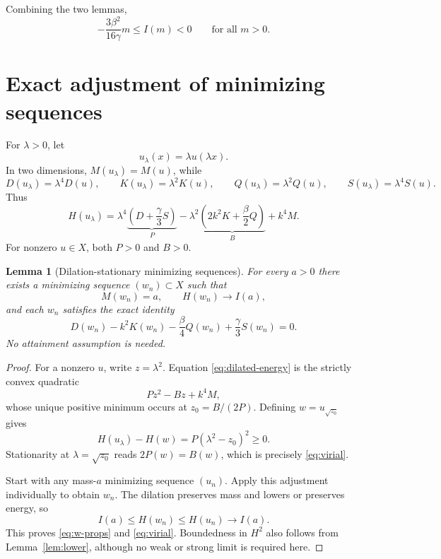 \documentclass[11pt,letterpaper]{article}
\numberwithin{equation}{section}
\newtheorem{lemma}[theorem]{Lemma}
\begin{document}
Combining the two lemmas,
\begin{equation}\label{eq:finite-negative}
 -\frac{3\beta^2}{16\gamma}m\le I(m)<0
 \qquad\text{for all }m>0.
\end{equation}

\section{Exact adjustment of minimizing sequences}

For $\lambda>0$, let
\begin{equation}\label{eq:dilation}
 u_\lambda(x)=\lambda u(\lambda x).
\end{equation}
In two dimensions, $M(u_\lambda)=M(u)$, while
\[
 D(u_\lambda)=\lambda^4 D(u),\qquad
 K(u_\lambda)=\lambda^2 K(u),\qquad
 Q(u_\lambda)=\lambda^2 Q(u),\qquad
 S(u_\lambda)=\lambda^4 S(u).
\]
Thus
\begin{equation}\label{eq:dilated-energy}
 H(u_\lambda)=\lambda^4\underbrace{\left(D+\frac\gamma3 S\right)}_{P}
 -\lambda^2\underbrace{\left(2k^2K+\frac\beta2 Q\right)}_{B}
 +k^4M.
\end{equation}
For nonzero $u\in X$, both $P>0$ and $B>0$.

\begin{lemma}[Dilation-stationary minimizing sequences]\label{lem:adjust}
For every $a>0$ there exists a minimizing sequence $(w_n)\subset X$ such that
\begin{equation}\label{eq:w-props}
 M(w_n)=a,\qquad H(w_n)\longrightarrow I(a),
\end{equation}
and each $w_n$ satisfies the exact identity
\begin{equation}\label{eq:virial}
 \boxed{\ D(w_n)-k^2K(w_n)-\frac\beta4 Q(w_n)
                   +\frac\gamma3 S(w_n)=0.\ }
\end{equation}
No attainment assumption is needed.
\end{lemma}
\begin{proof}
For a nonzero $u$, write $z=\lambda^2$. Equation \eqref{eq:dilated-energy} is the strictly convex quadratic
\[
 Pz^2-Bz+k^4M,
\]
whose unique positive minimum occurs at $z_0=B/(2P)$. Defining $w=u_{\sqrt{z_0}}$ gives
\begin{equation}\label{eq:exact-square}
 H(u_\lambda)-H(w)=P(\lambda^2-z_0)^2\ge0.
\end{equation}
Stationarity at $\lambda=\sqrt{z_0}$ reads $2P(w)=B(w)$, which is precisely \eqref{eq:virial}.

Start with any mass-$a$ minimizing sequence $(u_n)$. Apply this adjustment individually to obtain $w_n$. The dilation preserves mass and lowers or preserves energy, so
\[
 I(a)\le H(w_n)\le H(u_n)\longrightarrow I(a).
\]
This proves \eqref{eq:w-props} and \eqref{eq:virial}. Boundedness in $H^2$ also follows from Lemma~\ref{lem:lower}, although no weak or strong limit is required here.
\end{proof}
\end{document}
